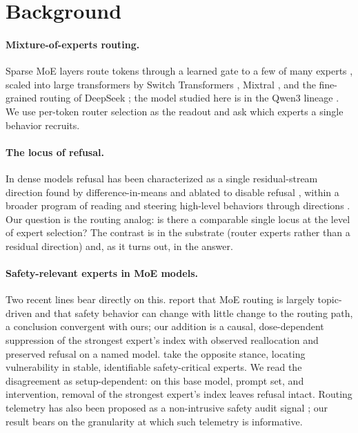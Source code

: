\documentclass[10pt,twocolumn]{article}
\begin{document}
\section{Background}
\label{sec:related}

\paragraph{Mixture-of-experts routing.}
Sparse MoE layers route tokens through a learned gate to a few of many experts
\citep{shazeer2017outrageously}, scaled into large transformers by Switch
Transformers \citep{fedus2022switch}, Mixtral \citep{jiang2024mixtral}, and
the fine-grained routing of DeepSeek \citep{dai2024deepseekmoe}; the model
studied here is in the Qwen3 lineage \citep{yang2025qwen3}. We use per-token
router selection as the readout and ask which experts a single behavior
recruits.

\paragraph{The locus of refusal.}
In dense models refusal has been characterized as a single residual-stream
direction found by difference-in-means and ablated to disable refusal
\citep{arditi2024refusal}, within a broader program of reading and steering
high-level behaviors through directions \citep{zou2023representation}. Our
question is the routing analog: is there a comparable single locus at the
level of expert selection? The contrast is in the substrate (router experts
rather than a residual direction) and, as it turns out, in the answer.

\paragraph{Safety-relevant experts in MoE models.}
Two recent lines bear directly on this. \citet{zhang2026understanding} report
that MoE routing is largely topic-driven and that safety behavior can change
with little change to the routing path, a conclusion convergent with ours;
our addition is a causal, dose-dependent suppression of the strongest
expert's index with observed reallocation and preserved refusal on a named
model.
\citet{lai2025safex} take the opposite stance, locating vulnerability in
stable, identifiable safety-critical experts. We read the disagreement as
setup-dependent: on this base model, prompt set, and intervention, removal
of the strongest expert's index leaves refusal intact. Routing telemetry has also
been proposed as a non-intrusive safety audit signal \citep{lv2026routescan};
our result bears on the granularity at which such telemetry is informative.
\end{document}
